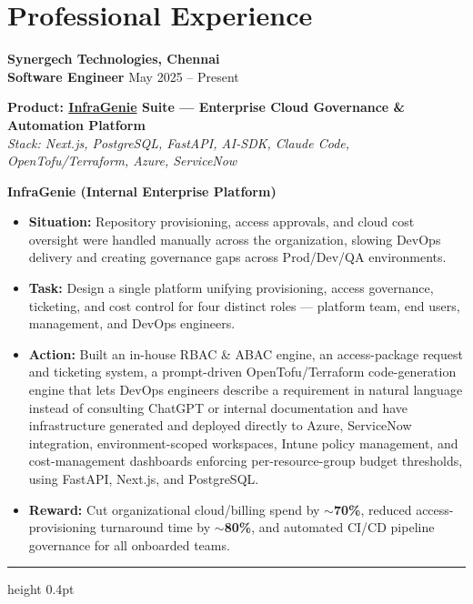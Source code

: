 \documentclass[a4paper,10pt]{article}
\newcommand{\projectdivider}{\vspace{4pt}\textcolor{dividercolor}{\hrule height 0.4pt}\vspace{4pt}}
\newcommand{\expblock}[1]{\noindent\textbf{#1}\par\vspace{1pt}}
\begin{document}
\section*{Professional Experience}

\noindent\textbf{Synergech Technologies, Chennai}\\
\textbf{Software Engineer} \hfill May 2025 -- Present

\vspace{6pt}
\noindent\textbf{Product: \href{https://infragenie.synergech.com/auth/sign-in}{InfraGenie} Suite — Enterprise Cloud Governance \& Automation Platform}\\
\textit{Stack: Next.js, PostgreSQL, FastAPI, AI-SDK, Claude Code, OpenTofu/Terraform, Azure, ServiceNow}

\vspace{4pt}
\expblock{InfraGenie (Internal Enterprise Platform)}
\begin{itemize}
\item \textbf{Situation:} Repository provisioning, access approvals, and cloud cost oversight were handled manually across the organization, slowing DevOps delivery and creating governance gaps across Prod/Dev/QA environments.
\item \textbf{Task:} Design a single platform unifying provisioning, access governance, ticketing, and cost control for four distinct roles — platform team, end users, management, and DevOps engineers.
\item \textbf{Action:} Built an in-house RBAC \& ABAC engine, an access-package request and ticketing system, a prompt-driven OpenTofu/Terraform code-generation engine that lets DevOps engineers describe a requirement in natural language instead of consulting ChatGPT or internal documentation and have infrastructure generated and deployed directly to Azure, ServiceNow integration, environment-scoped workspaces, Intune policy management, and cost-management dashboards enforcing per-resource-group budget thresholds, using FastAPI, Next.js, and PostgreSQL.
\item \textbf{Reward:} Cut organizational cloud/billing spend by \textbf{$\sim$70\%}, reduced access-provisioning turnaround time by \textbf{$\sim$80\%}, and automated CI/CD pipeline governance for all onboarded teams.
\end{itemize}

\projectdivider
\end{document}

